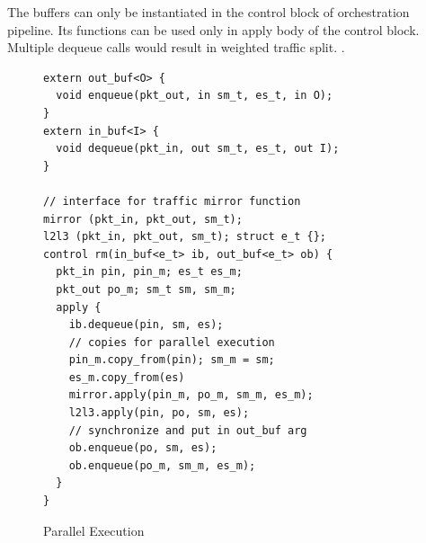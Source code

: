 \documentclass{hotnets19}
\begin{document}
The buffers can only be instantiated in the control block of orchestration pipeline.
Its functions can be used only in apply body of the control block.
Multiple dequeue calls would result in weighted traffic split.
.
\begin{figure}
\begin{lstlisting}[frame=none]
extern out_buf<O> {
  void enqueue(pkt_out, in sm_t, es_t, in O); 
}
extern in_buf<I> {
  void dequeue(pkt_in, out sm_t, es_t, out I); 
}

// interface for traffic mirror function
mirror (pkt_in, pkt_out, sm_t);
l2l3 (pkt_in, pkt_out, sm_t); struct e_t {};
control rm(in_buf<e_t> ib, out_buf<e_t> ob) {
  pkt_in pin, pin_m; es_t es_m;
  pkt_out po_m; sm_t sm, sm_m;
  apply {
    ib.dequeue(pin, sm, es);
    // copies for parallel execution
    pin_m.copy_from(pin); sm_m = sm; 
    es_m.copy_from(es)
    mirror.apply(pin_m, po_m, sm_m, es_m);
    l2l3.apply(pin, po, sm, es);
    // synchronize and put in out_buf arg
    ob.enqueue(po, sm, es);
    ob.enqueue(po_m, sm_m, es_m);
  }
}
\end{lstlisting}
\caption{Parallel Execution}
\label{fig:parallel-execution}
\end{figure}
\end{document}
